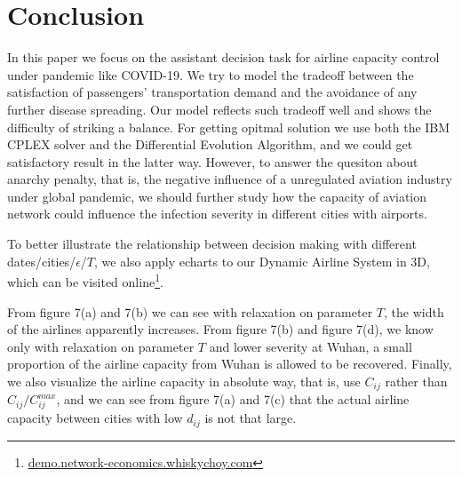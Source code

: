 \section{Conclusion}
In this paper we focus on the assistant decision task for airline capacity control under pandemic like COVID-19. We try to model the tradeoff between the satisfaction of passengers' transportation demand and the avoidance of any further disease spreading. Our model reflects such tradeoff well and shows the difficulty of striking a balance. For getting opitmal solution we use both the IBM CPLEX solver and the Differential Evolution Algorithm, and we could get satisfactory result in the latter way. However, to answer the quesiton about anarchy penalty, that is, the negative influence of a unregulated aviation industry under global pandemic, we should further study how the capacity of aviation network could influence the infection severity in different cities with airports.

To better illustrate the relationship between decision making with different dates/cities/$\epsilon$/$T$, we also apply echarts to our Dynamic Airline System in 3D, which can be visited online\footnote{\url{demo.network-economics.whiskychoy.com}}.

From figure 7(a) and 7(b) we can see with relaxation on parameter $T$, the width of the airlines apparently increases. From figure 7(b) and figure 7(d), we know only with relaxation on parameter $T$ and lower severity at Wuhan, a small proportion of the airline capacity from Wuhan is allowed to be recovered. Finally, we also visualize the airline capacity in absolute way, that is, use $C_{ij}$ rather than $C_{ij}/C_{ij}^{max}$, and we can see from figure 7(a) and 7(c) that the actual airline capacity between cities with low $d_{ij}$ is not that large.

